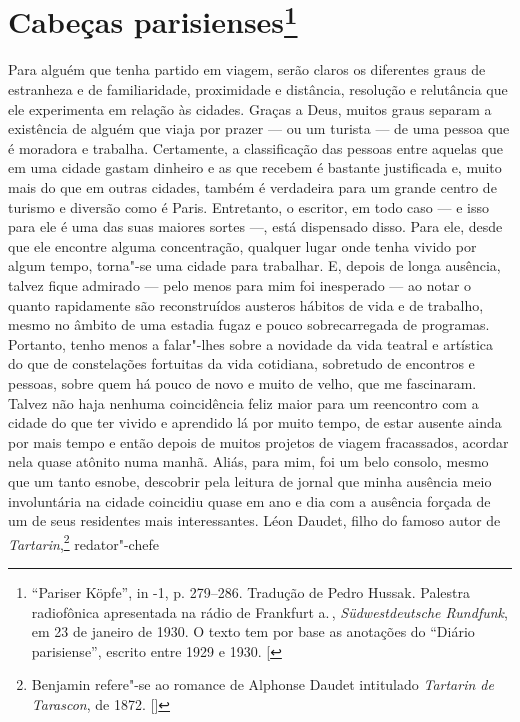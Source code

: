 \chapter{Cabeças parisienses\footnote[*]{``Pariser Köpfe'', in -1, p.
  279--286. Tradução de Pedro Hussak. Palestra radiofônica apresentada na rádio de Frankfurt a.\,, \emph{Südwestdeutsche Rundfunk}, em 23 de janeiro de 1930. O texto tem por base as anotações do ``Diário parisiense'', escrito entre 1929 e 1930. {[}\versal{N.~O.}{]}}}

Para alguém que tenha partido em viagem, serão claros os diferentes
graus de estranheza e de familiaridade, proximidade e distância,
resolução e relutância que ele experimenta em relação às cidades. Graças
a Deus, muitos graus separam a existência de alguém que viaja por prazer
--- ou um turista --- de uma pessoa que é moradora e trabalha. Certamente, a
classificação das pessoas entre aquelas que em uma cidade gastam
dinheiro e as que recebem é bastante justificada e, muito mais do que em outras cidades, também é verdadeira para um grande centro de turismo e
diversão como é Paris. Entretanto, o escritor, em todo caso --- e isso para ele é uma das suas maiores sortes ---, está dispensado disso. Para ele, desde que ele encontre alguma concentração, qualquer lugar
onde tenha vivido por algum tempo, torna"-se uma cidade para
trabalhar. E, depois de longa ausência, talvez fique admirado --- pelo menos para mim foi inesperado --- ao notar o quanto rapidamente são reconstruídos austeros hábitos de vida e de trabalho, mesmo no âmbito de uma estadia fugaz e pouco sobrecarregada de programas. Portanto, tenho menos a falar"-lhes sobre a novidade da vida teatral e artística do que de constelações fortuitas da vida cotidiana, sobretudo de encontros e pessoas, sobre quem há pouco de novo e muito de velho, que me fascinaram.
Talvez não haja nenhuma coincidência feliz maior para um reencontro com
a cidade do que ter vivido e aprendido lá por muito tempo, de estar
ausente ainda por mais tempo e então depois de muitos projetos de viagem
fracassados, acordar nela quase atônito numa manhã. Aliás, para mim, foi
um belo consolo, mesmo que um tanto esnobe, descobrir pela leitura de
jornal que minha ausência meio involuntária na cidade coincidiu quase em
ano e dia com a ausência forçada de um de seus residentes mais
interessantes. Léon Daudet, filho do famoso autor de
\emph{Tartarin},\footnote{Benjamin refere"-se ao romance de Alphonse
  Daudet intitulado \emph{Tartarin de Tarascon}, de 1872. []} redator"-chefe
